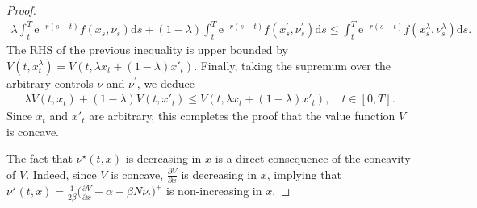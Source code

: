 \documentclass[10pt,a4paper]{amsart}
\def\drm{\mathrm{d}}
\def\erm{\mathrm{e}}
\begin{document}
\begin{proof}
\begin{align*}
    \lambda \int_t^T \erm^{-r(s-t)}  f(x_s, \nu_s) \drm s
    + (1-\lambda) \int_t^T \erm^{-r(s-t)}  f(x^\prime_s, \nu^\prime_s) \drm s
    \leq \int_t^T \erm^{-r(s-t)} f(x^\lambda_s, \nu^\lambda_s) \drm s.
\end{align*}
The RHS of the previous inequality is upper bounded by $V(t,x_t^\lambda) = V(t,\lambda x_t+(1-\lambda)x'_t)$. Finally, taking the supremum over the arbitrary controls $\nu$ and $\nu^\prime$, we deduce
\begin{align*}
    \lambda V(t,x_t)+(1-\lambda)V(t,x'_t) \leq V(t,\lambda x_t+(1-\lambda)x'_t), \quad t \in [0,T].
\end{align*}
Since \(x_t\) and \(x'_t\) are arbitrary, this completes the proof that the value function \(V\) is concave.


The fact that $\nu^\star(t,x)$ is decreasing in $x$ is a direct consequence of the concavity of $V$. Indeed, since $V$ is concave, $\frac{\partial V}{ \partial x}$ is decreasing in $x$, implying that $\nu^\star(t,x)=\frac{1}{2\beta}\big( \frac{\partial V}{\partial x}-\alpha-\beta N\bar{\nu}_t \big)^+$ is non-increasing in $x$.
\end{proof}
\end{document}
